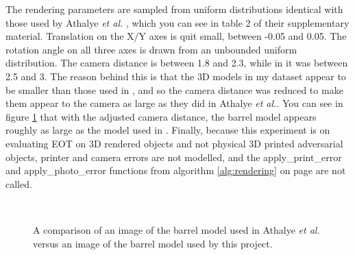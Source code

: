The rendering parameters are sampled from uniform distributions identical with those used by Athalye \textit{et al.} \cite{athalye}, which you can see in table 2 of their supplementary material. Translation on the X/Y axes is quit small, between -0.05 and 0.05. The rotation angle on all three axes is drawn from an unbounded uniform distribution. The camera distance is between 1.8 and 2.3, while in \cite{athalye} it was between 2.5 and 3. The reason behind this is that the 3D models in my dataset appear to be smaller than those used in \cite{athalye}, and so the camera distance was reduced to make them appear to the camera as large as they did in Athalye \textit{et al.}. You can see in figure \ref{fig:barrel_comparison} that with the adjusted camera distance, the barrel model appears roughly as large as the model used in \cite{athalye}. Finally, because this experiment is on evaluating EOT on 3D rendered objects and not physical 3D printed adversarial objects, printer and camera errors are not modelled, and the apply\_print\_error and apply\_photo\_error functions from algorithm \ref{alg:rendering} on page \pageref{alg:rendering} are not called.

\begin{figure}[H]
\centering
{}~ %
\\ %

\caption[Comparison of the camera distances used in Athalye \textit{et al.} versus this project.]{A comparison of an image of the barrel model used in Athalye \textit{et al.} versus an image of the barrel model used by this project.}
\label{fig:barrel_comparison}
\end{figure}

